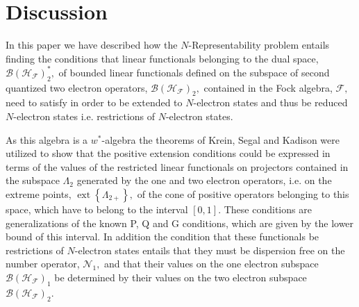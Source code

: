 \documentclass[aps,preprint,amsfonts,amssymb,showpacs,showkeys]{revtex4}%
\begin{document}
\section{Discussion \label{Discussion}}

In this paper we have described how the $N$-Representability problem entails
finding the conditions that linear functionals belonging to the dual space,
$\mathcal{B}\left(  \mathcal{H}_{\mathcal{F}}\right)  _{2}^{\ast},$ of bounded
linear functionals defined on the subspace of second quantized two electron
operators, $\mathcal{B}\left(  \mathcal{H}_{\mathcal{F}}\right)  _{2},$
contained in the Fock algebra, $\mathcal{F},$ need to satisfy in order to be
extended to $N$-electron states and thus be reduced $N$-electron states i.e.
restrictions of $N$-electron states.

As this algebra is a $w^{\ast}$-algebra the theorems of Krein, Segal and
Kadison were utilized to show that the positive extension conditions could be
expressed in terms of the values of the restricted linear functionals on
projectors contained in the subspace $\Lambda_{2}$ generated by the one and
two electron operators, i.e. on the extreme points, $\operatorname*{ext}%
\left\{  \Lambda_{2+}\right\}  ,$ of the cone of positive operators belonging
to this space, which have to belong to the interval $\left[  0,1\right]  .$
These conditions are generalizations of the known P, Q and G conditions, which
are given by the lower bound of this interval. In addition the condition that
these functionals be restrictions of $N$-electron states entails that they
must be dispersion free on the number operator, $\mathcal{N}_{1},$ and that
their values on the one electron subspace $\mathcal{B}\left(  \mathcal{H}%
_{\mathcal{F}}\right)  _{1}$ be determined by their values on the two electron
subspace $\mathcal{B}\left(  \mathcal{H}_{\mathcal{F}}\right)  _{2}$.
\end{document}
